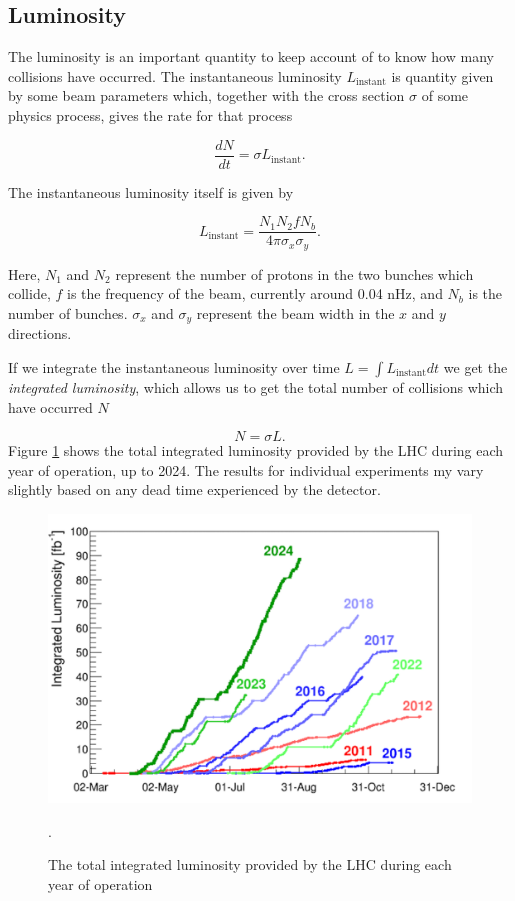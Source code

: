 \documentclass[10pt,a4paper]{book}
\begin{document}
\subsection{Luminosity}

The luminosity is an important quantity to keep account of to know how many collisions have occurred. The instantaneous luminosity $L_{\text{instant}}$ is quantity given by some beam parameters which, together with the cross section $\sigma$ of some physics process, gives the rate for that process 

\begin{equation}
    \frac{dN}{dt} = \sigma L_{\text{instant}}.
\end{equation}

The instantaneous luminosity itself is given by

\begin{equation}
L_{\text{instant}} = \frac{N_1N_2fN_b}{4\pi\sigma_x\sigma_y}.
\end{equation}

Here, $N_1$ and $N_2$ represent the number of protons in the two bunches which collide, $f$ is the frequency of the beam, currently around 0.04 nHz, and $N_b$ is the number of bunches. $\sigma_x$ and $\sigma_y$ represent the beam width in the $x$ and $y$ directions.

If we integrate the instantaneous luminosity over time $L = \int L_{\text{instant}}dt$ we get the \emph{integrated luminosity}, which allows us to get the total number of collisions which have occurred $N$

\begin{equation}
    N = \sigma L.
\end{equation}
Figure \ref{lumi} shows the total integrated luminosity provided by the LHC during each year of operation, up to 2024. The results for individual experiments my vary slightly based on any dead time experienced by the detector.

\begin{figure}
    \centering
    \includegraphics[width=0.9\linewidth]{lumi}
    \caption{The total integrated luminosity provided by the LHC during each year of operation \cite{CERN}}.
    \label{lumi}
\end{figure}
\end{document}
